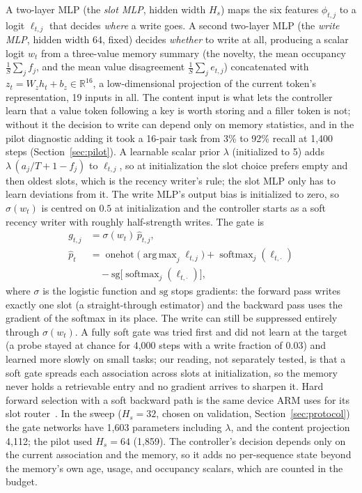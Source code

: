 \documentclass[conference]{IEEEtran}
\DeclareMathOperator*{\softmax}{softmax}
\DeclareMathOperator*{\argmax}{arg\,max}
\DeclareMathOperator{\onehot}{onehot}
\begin{document}
A two-layer MLP (the \emph{slot MLP}, hidden width $H_s$) maps the six
features $\phi_{t,j}$ to a logit $\ell_{t,j}$ that decides \emph{where} a write
goes. A second two-layer MLP (the \emph{write MLP}, hidden width 64, fixed)
decides \emph{whether} to write at all, producing a scalar logit $w_t$ from a
three-value memory summary (the novelty, the mean occupancy
$\frac{1}{S}\sum_j f_j$, and the mean value disagreement
$\frac{1}{S}\sum_j e_{t,j}$) concatenated with $z_t = W_z h_t + b_z \in
\mathbb{R}^{16}$, a low-dimensional projection of the current token's
representation, 19 inputs in all. The content input is what lets the
controller learn that a value token following a key is worth storing and a
filler token is not; without it the decision to write can depend only on memory
statistics, and in the pilot diagnostic adding it took a 16-pair task from 3\%
to 92\% recall at 1{,}400 steps (Section~\ref{sec:pilot}). A learnable scalar prior
$\lambda$ (initialized to 5) adds $\lambda\,(a_j/T + 1 - f_j)$ to $\ell_{t,j}$,
so at initialization the slot choice prefers empty and then oldest slots, which
is the recency writer's rule; the slot MLP only has to learn deviations from
it. The write MLP's output bias is initialized to zero, so $\sigma(w_t)$ is
centred on $0.5$ at initialization and the controller starts as a soft recency
writer with roughly half-strength writes. The gate is
\begin{equation}
\begin{split}
g_{t,j} &= \sigma(w_t)\, \hat{p}_{t,j},\\
\hat{p}_{t} &= \onehot\!\big(\argmax_j \ell_{t,j}\big) + \softmax_j(\ell_{t,\cdot})\\
&\quad - \mathrm{sg}\big[\softmax_j(\ell_{t,\cdot})\big],
\end{split}
\label{eq:gate}
\end{equation}
where $\sigma$ is the logistic function and $\mathrm{sg}$ stops gradients: the
forward pass writes exactly one slot (a straight-through estimator) and the
backward pass uses the gradient of the softmax in its place. The write can
still be suppressed entirely through $\sigma(w_t)$. A fully soft gate was
tried first and did not learn at the target (a probe stayed at chance for
4{,}000 steps with a write fraction of 0.03) and learned more slowly on small
tasks; our reading, not separately tested, is that a soft gate spreads each
association across slots at initialization, so the memory never holds a
retrievable entry and no gradient arrives to sharpen it. Hard forward selection with a soft backward
path is the same device ARM uses for its slot router~\cite{zeng2026arm}. In
the sweep ($H_s = 32$, chosen on validation, Section~\ref{sec:protocol}) the
gate networks have 1{,}603 parameters including $\lambda$, and the content
projection 4{,}112; the pilot used $H_s = 64$ (1{,}859). The controller's
decision depends only on the current association and the memory, so it adds no
per-sequence state beyond the memory's own age, usage, and occupancy scalars,
which are counted in the budget.
\end{document}
